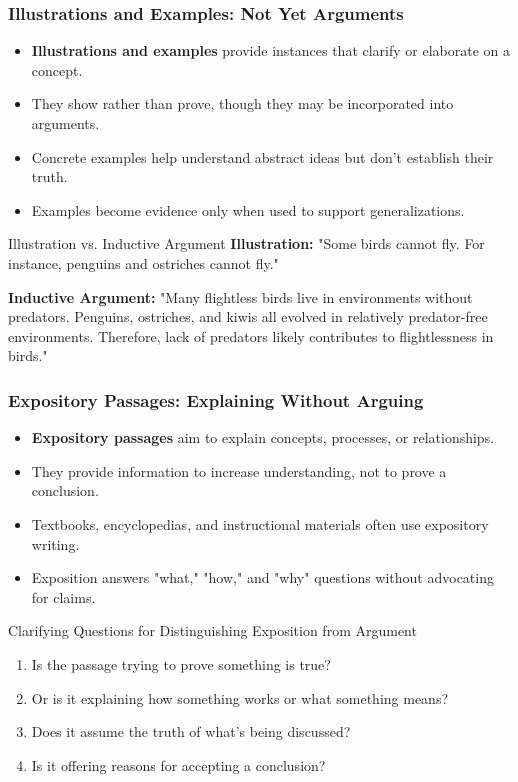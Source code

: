 \documentclass{beamer}
\begin{document}
\begin{frame}
    \frametitle{Illustrations and Examples: Not Yet Arguments}
    \begin{itemize}
        \item \textbf{Illustrations and examples} provide instances that clarify or elaborate on a concept.
        \item They show rather than prove, though they may be incorporated into arguments.
        \item Concrete examples help understand abstract ideas but don't establish their truth.
        \item Examples become evidence only when used to support generalizations.
    \end{itemize}
    
    \begin{exampleblock}{Illustration vs. Inductive Argument}
        \textbf{Illustration:} "Some birds cannot fly. For instance, penguins and ostriches cannot fly."
        
        \textbf{Inductive Argument:} "Many flightless birds live in environments without predators. Penguins, ostriches, and kiwis all evolved in relatively predator-free environments. Therefore, lack of predators likely contributes to flightlessness in birds."
    \end{exampleblock}
\end{frame}

\begin{frame}
    \frametitle{Expository Passages: Explaining Without Arguing}
    \begin{itemize}
        \item \textbf{Expository passages} aim to explain concepts, processes, or relationships.
        \item They provide information to increase understanding, not to prove a conclusion.
        \item Textbooks, encyclopedias, and instructional materials often use expository writing.
        \item Exposition answers "what," "how," and "why" questions without advocating for claims.
    \end{itemize}
    
    \begin{block}{Clarifying Questions for Distinguishing Exposition from Argument}
        \begin{enumerate}
            \item Is the passage trying to prove something is true?
            \item Or is it explaining how something works or what something means?
            \item Does it assume the truth of what's being discussed?
            \item Is it offering reasons for accepting a conclusion?
        \end{enumerate}
    \end{block}
\end{frame}
\end{document}
